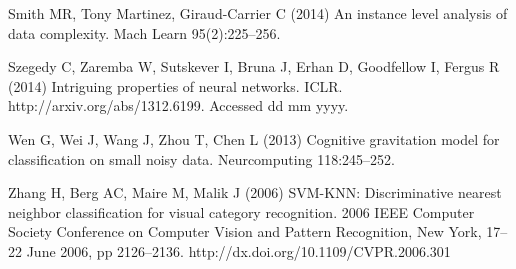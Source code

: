 \begin{thebibliography}{}
Smith MR, Tony Martinez, Giraud-Carrier C (2014) An instance level analysis of data complexity. Mach Learn 95(2):225--256.

Szegedy C, Zaremba W, Sutskever I, Bruna J, Erhan D, Goodfellow I, Fergus R (2014) Intriguing properties of neural networks. ICLR. http://arxiv.org/abs/1312.6199. Accessed dd mm yyyy.

Wen G, Wei J, Wang J, Zhou T, Chen L (2013) Cognitive gravitation model for classification on small noisy data. Neurcomputing 118:245--252.

Zhang H, Berg AC, Maire M, Malik J (2006) SVM-KNN: Discriminative nearest neighbor classification for visual category recognition. 2006 IEEE Computer Society Conference on Computer Vision and Pattern Recognition, New York, 17--22 June 2006, pp 2126--2136. http://dx.doi.org/10.1109/CVPR.2006.301

\end{thebibliography}



